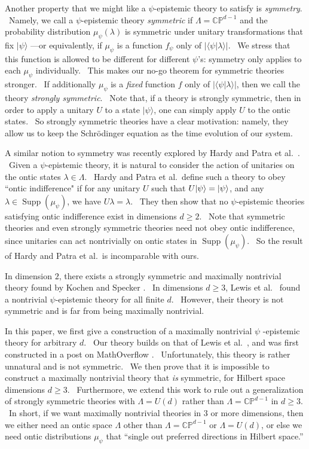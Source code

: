 \documentclass[letterpaper,11pt]{article}
\newcommand{\ket}[1]{\mbox{$ | #1 \rangle $}}
\DeclareMathOperator{\supp}{Supp}
\begin{document}
Another property that we might like a $\psi$-epistemic theory to satisfy is
\textit{symmetry}. \ Namely, we call a $\psi$-epistemic theory \textit{%
symmetric} if $\Lambda=\mathbb{CP}^{d-1}$ and the probability distribution $\mu_\psi(\lambda)$ is
symmetric under unitary transformations that fix $ | \psi \rangle $%
---or equivalently, if $\mu_{\psi}$ is a function $f_{\psi}$ only of $| \langle
\psi | \lambda \rangle |$. \ We stress that this function is allowed to be different for different $\psi$'s: symmetry
only applies to each $\mu_{\psi}$ individually. \ This makes our no-go theorem for symmetric theories stronger. \ If
additionally $\mu_{\psi}$ is a \emph{fixed} function $f$ only of $| \langle
\psi | \lambda \rangle |$, then we call the theory \emph{strongly symmetric}. \ Note that, if a theory is strongly symmetric, then in order to apply a unitary $U$ to a state $|\psi \rangle$, one can simply apply $U$ to the ontic states. \ So strongly symmetric theories have a clear motivation: namely, they allow us to keep the Schr\"{o}dinger equation as the time evolution of our system.

A similar notion to symmetry was recently explored by Hardy \cite{hardy} and Patra et al.\ \cite{patra}. \ Given a $\psi$-epistemic theory, it is natural to consider the action of unitaries on the ontic states $\lambda \in \Lambda$. \ Hardy and Patra et al.\ define such a theory to obey ``ontic indifference" if for any unitary $U$ such that $U\ket{\psi}=\ket{\psi}$, and any $\lambda \in \supp(\mu_\psi)$, we have $U\lambda=\lambda$. \ They then show that no $\psi$-epistemic theories satisfying ontic indifference exist in dimensions $d\geq 2$. \ Note that symmetric theories and even strongly symmetric theories need not obey ontic indifference, since unitaries can act nontrivially on ontic states in $\supp(\mu_\psi)$. \ So the result of Hardy and Patra et al.\ is incomparable with ours.

In dimension $2$, there exists a
strongly symmetric and maximally nontrivial theory found by Kochen and Specker \cite%
{ks}. \ In dimensions $d\geq 3$, Lewis et al.\ \cite{lewis} found a
nontrivial $\psi$-epistemic theory for all finite $d$. \ However, their
theory is not symmetric and is far from being maximally nontrivial.

In this paper, we first give a construction of a maximally nontrivial $\psi$%
-epistemic theory for arbitrary $d$. \ Our theory builds on that of
Lewis et al.\ \cite{lewis}, and was first constructed in a post on
MathOverflow \cite{mathoverflow}. \ Unfortunately, this theory is rather unnatural and is
not symmetric. \ We then prove that it is impossible to construct a
maximally nontrivial theory that \emph{is} symmetric, for Hilbert space
dimensions $d\geq 3$. \ Furthermore, we extend this work to rule out a generalization of strongly symmetric theories with $\Lambda=U(d)$ rather than $\Lambda = \mathbb{CP}^{d-1}$ in $d\geq 3$. \ In short, if we want maximally nontrivial
theories in $3$ or more dimensions, then we either need an
ontic space $\Lambda$ other than $\Lambda = \mathbb{CP}^{d-1}$ or $\Lambda=U(d)$, or else we need ontic distributions $\mu_{\psi}$ that
``single out preferred directions in Hilbert space.''
\end{document}

